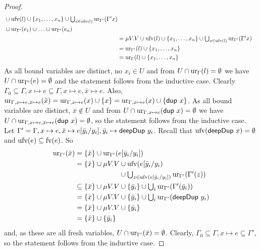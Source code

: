 \documentclass[preprint]{sigplanconf}
\theoremstyle{nonumberplain}
\newtheorem{proof}{Proof}
\begin{document}
\begin{proof}
\begin{align*}
\begin{aligned}[t]
&\cup \text{ufv}(l) \cup \{x_1,\ldots,x_n\} \cup \textstyle\bigcup_{x\in \text{ufv}(l)}\text{ur}_{\Gamma'}(\Gamma' x) \\
&\cup \text{ur}_{\Gamma'}(e_1) \cup \ldots \cup \text{ur}_{\Gamma'}(e_n)
\end{aligned}\\
&= \mu V. V \cup \text{ufv}(l) \cup \{x_1,\ldots,x_n\} \cup \textstyle\bigcup_{x\in \text{ufv}(l)}\text{ur}_{\Gamma'}(\Gamma' x)\\
&= \text{ur}_{\Gamma'}(l) \cup \{x_1,\ldots,x_n\}\\
&= \text{ur}_{\Gamma}(l) \cup \{x_1,\ldots,x_n\}
\end{align*}
As all bound variables are distinct, no $x_i\in U$ and from $U\cap \text{ur}_{\Gamma}(l)
= \emptyset$ we have $U \cap \text{ur}_{\Gamma'}(e) = \emptyset$ and the statement
follows from the inductive case.
Clearly $\Gamma_0 \subseteq \Gamma, x\mapsto e \subseteq \Gamma, x\mapsto e, \bar x \mapsto e$. Also, $\text{ur}_{\Gamma,x\mapsto e, \bar x\mapsto e}(\bar x) = \text{ur}_{\Gamma, x\mapsto e}(x) \cup \{x\} = \text{ur}_{\Gamma, x\mapsto e}(x) \cup \{\text{\textsf{dup}}\ x\} $. As all bound variables are distinct, $\bar x\notin U$ and from $U \cap \text{ur}_{\Gamma, x\mapsto e}(\text{\textsf{dup}}\ x)= \emptyset$ we have $U \cap \text{ur}_{\Gamma,x\mapsto e, \bar x \mapsto e}(\text{\textsf{dup}}\ x)=\emptyset$, so the statement follows from the inductive case.
Let $\Gamma' = \Gamma, x\mapsto e, \bar x\mapsto e[\bar y_i/y_i], \bar y_i \mapsto \text{\textsf{deepDup}}\ y_i$.
Recall that $\text{ufv}(\text{\textsf{deepDup}}\ x)=\emptyset$ and $\text{ufv}(e) \subseteq \text{fv}(e)$. So 
\begin{align*}
\text{ur}_{\Gamma'}(\bar x)
&= \{\bar x\} \cup \text{ur}_{\Gamma'}(e[\bar y_i/y_i]) \\
&= \{\bar x\} \cup \mu V. V
\begin{aligned}[t]
&\cup \text{ufv}(e[\bar y_i / y_i)\\
&\cup \textstyle\bigcup_{z \in \text{ufv}(e[\bar y_i / y_i])} \text{ur}_{\Gamma'}(\Gamma'(z))
\end{aligned}\\
&\subseteq \{\bar x\} \cup \mu V. V \cup \{\bar y_i\} \cup \textstyle\bigcup_{i} \text{ur}_{\Gamma'}(\Gamma'(\bar y_i)) \\
&= \{\bar x\} \cup \mu V. V \cup \{\bar y_i\} \cup \textstyle\bigcup_{i} \text{ur}_{\Gamma'}(\text{\textsf{deepDup}}\ y_i)\\
&= \{\bar x\} \cup \mu V. V \cup \{\bar y_i\}  \\
&= \{\bar x\} \cup \{\bar y_i\}
\end{align*}
and, as these are all fresh variables, $U \cap \text{ur}_{\Gamma'}(\bar x) = \emptyset$. Clearly, $\Gamma_0 \subseteq \Gamma, x\mapsto e \subseteq \Gamma'$, so the statement follows from the inductive case.
\end{proof}
\end{document}
